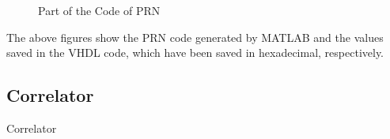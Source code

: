 \begin{figure}[!h]
    \centering
    \caption{Part of the Code of PRN }
    \label{fig:prn2_code}
\end{figure}

The above figures show the PRN  code generated by MATLAB and the values saved in the VHDL code, which have been saved in hexadecimal, respectively.

\subsection{Correlator}
Correlator